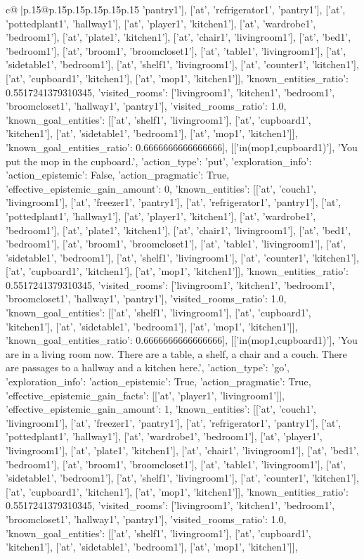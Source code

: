 \documentclass{article}
\begin{document}
{\begin{supertabular}{c@{$\;$}|p{.15\linewidth}@{}p{.15\linewidth}p{.15\linewidth}p{.15\linewidth}p{.15\linewidth}p{.15\linewidth}}
{{{'pantry1'], ['at', 'refrigerator1', 'pantry1'], ['at', 'pottedplant1', 'hallway1'], ['at', 'player1', 'kitchen1'], ['at', 'wardrobe1', 'bedroom1'], ['at', 'plate1', 'kitchen1'], ['at', 'chair1', 'livingroom1'], ['at', 'bed1', 'bedroom1'], ['at', 'broom1', 'broomcloset1'], ['at', 'table1', 'livingroom1'], ['at', 'sidetable1', 'bedroom1'], ['at', 'shelf1', 'livingroom1'], ['at', 'counter1', 'kitchen1'], ['at', 'cupboard1', 'kitchen1'], ['at', 'mop1', 'kitchen1']], 'known_entities_ratio': 0.5517241379310345, 'visited_rooms': ['livingroom1', 'kitchen1', 'bedroom1', 'broomcloset1', 'hallway1', 'pantry1'], 'visited_rooms_ratio': 1.0, 'known_goal_entities': [['at', 'shelf1', 'livingroom1'], ['at', 'cupboard1', 'kitchen1'], ['at', 'sidetable1', 'bedroom1'], ['at', 'mop1', 'kitchen1']], 'known_goal_entities_ratio': 0.6666666666666666}}], [['in(mop1,cupboard1)'], 'You put the mop in the cupboard.', {'action_type': 'put', 'exploration_info': {'action_epistemic': False, 'action_pragmatic': True, 'effective_epistemic_gain_amount': 0, 'known_entities': [['at', 'couch1', 'livingroom1'], ['at', 'freezer1', 'pantry1'], ['at', 'refrigerator1', 'pantry1'], ['at', 'pottedplant1', 'hallway1'], ['at', 'player1', 'kitchen1'], ['at', 'wardrobe1', 'bedroom1'], ['at', 'plate1', 'kitchen1'], ['at', 'chair1', 'livingroom1'], ['at', 'bed1', 'bedroom1'], ['at', 'broom1', 'broomcloset1'], ['at', 'table1', 'livingroom1'], ['at', 'sidetable1', 'bedroom1'], ['at', 'shelf1', 'livingroom1'], ['at', 'counter1', 'kitchen1'], ['at', 'cupboard1', 'kitchen1'], ['at', 'mop1', 'kitchen1']], 'known_entities_ratio': 0.5517241379310345, 'visited_rooms': ['livingroom1', 'kitchen1', 'bedroom1', 'broomcloset1', 'hallway1', 'pantry1'], 'visited_rooms_ratio': 1.0, 'known_goal_entities': [['at', 'shelf1', 'livingroom1'], ['at', 'cupboard1', 'kitchen1'], ['at', 'sidetable1', 'bedroom1'], ['at', 'mop1', 'kitchen1']], 'known_goal_entities_ratio': 0.6666666666666666}}], [['in(mop1,cupboard1)'], 'You are in a living room now. There are a table, a shelf, a chair and a couch. There are passages to a hallway and a kitchen here.', {'action_type': 'go', 'exploration_info': {'action_epistemic': True, 'action_pragmatic': True, 'effective_epistemic_gain_facts': [['at', 'player1', 'livingroom1']], 'effective_epistemic_gain_amount': 1, 'known_entities': [['at', 'couch1', 'livingroom1'], ['at', 'freezer1', 'pantry1'], ['at', 'refrigerator1', 'pantry1'], ['at', 'pottedplant1', 'hallway1'], ['at', 'wardrobe1', 'bedroom1'], ['at', 'player1', 'livingroom1'], ['at', 'plate1', 'kitchen1'], ['at', 'chair1', 'livingroom1'], ['at', 'bed1', 'bedroom1'], ['at', 'broom1', 'broomcloset1'], ['at', 'table1', 'livingroom1'], ['at', 'sidetable1', 'bedroom1'], ['at', 'shelf1', 'livingroom1'], ['at', 'counter1', 'kitchen1'], ['at', 'cupboard1', 'kitchen1'], ['at', 'mop1', 'kitchen1']], 'known_entities_ratio': 0.5517241379310345, 'visited_rooms': ['livingroom1', 'kitchen1', 'bedroom1', 'broomcloset1', 'hallway1', 'pantry1'], 'visited_rooms_ratio': 1.0, 'known_goal_entities': [['at', 'shelf1', 'livingroom1'], ['at', 'cupboard1', 'kitchen1'], ['at', 'sidetable1', 'bedroom1'], ['at', 'mop1', 'kitchen1']], }}}
\end{supertabular}}
\end{document}
